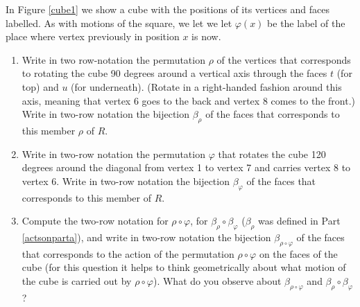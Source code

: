 \bp 
\iteme In Figure \ref{cube1} we show a cube with the positions of its
vertices and faces labelled.  As with motions of the square, we let we let 
$\varphi(x)$ be the label of the place where vertex  previously in
position
$x$ is now.
\begin{enumerate}
\item Write in two row-notation the permutation $\rho$ of the vertices
that corresponds to rotating the cube 90 degrees around a vertical axis
through the faces $t$ (for top) and $u$ (for underneath).  (Rotate in a
right-handed fashion around this axis, meaning that vertex 6 goes to the
back and vertex 8 comes to the front.)  Write in two-row notation the
bijection
$\beta_{\rho}$ of the faces that corresponds to this member $\rho$ of
$R$.\label{actsonparta}
\item Write in two-row notation the permutation $\varphi$ that rotates
the cube 120 degrees around the diagonal from vertex 1 to vertex 7 and
carries vertex 8 to vertex 6.  Write in two-row notation the bijection
$\beta_\varphi$ of the faces that corresponds to this member of $R$.
\item Compute the two-row notation for $\rho\circ\varphi$, for
$\beta_{\rho}\circ\beta_{\varphi}$ ($\beta_{\rho}$ was defined in Part
\ref{actsonparta}), and write in two-row notation the bijection 
$\beta_{\rho\circ\varphi}$ of the faces that corresponds to the action of
the permutation $\rho\circ\varphi$ on the faces of the cube (for this
question it helps to think geometrically about what motion of the cube is
carried out by $\rho\circ\varphi$).  What do you observe about
$\beta_{\rho\circ\varphi}$ and
$\beta_{\rho}\circ\beta_{\varphi}$?\label{cube2}
\end{enumerate}
